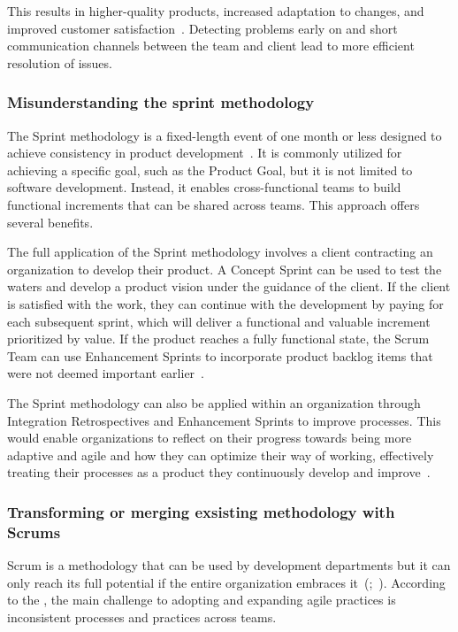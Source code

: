 This results in higher-quality products, increased \gls{adaptation} to changes, and improved \gls{customer} satisfaction~\cite[p.~99]{Abrahmson2002ASD}. Detecting problems early on and short communication channels between the team and \gls{client} lead to more efficient resolution of issues.

\subsubsection{Misunderstanding the sprint methodology}\label{subsubsec:UnderstandingSprints}
The Sprint \gls{methodology} is a fixed-length event of one month or less designed to achieve consistency in product development~\cite[p.~7]{Schwaber2020Tsg}. It is commonly utilized for achieving a specific goal, such as the Product Goal, but it is not limited to software development. Instead, it enables cross-functional teams to build functional increments that can be shared across teams. This approach offers several benefits.

The full application of the Sprint \gls{methodology} involves a \gls{client} contracting an organization to develop their product. A Concept Sprint can be used to test the waters and develop a product vision under the guidance of the \gls{client}. If the \gls{client} is satisfied with the work, they can continue with the development by paying for each subsequent sprint, which will deliver a functional and valuable increment prioritized by value. If the product reaches a fully functional state, the Scrum Team can use Enhancement Sprints to incorporate product backlog items that were not deemed important earlier~\cite[p.~2]{Sutherland2005Fos}.

The Sprint \gls{methodology} can also be applied within an organization through Integration Retrospectives and Enhancement Sprints to improve processes. This would enable organizations to reflect on their progress towards being more adaptive and \gls{agile} and how they can optimize their way of working, effectively treating their processes as a product they continuously develop and improve~\cite[pp.~395--396]{Rubin2012ESA}.

\subsubsection*{Transforming or merging exsisting methodology with Scrums}\label{subsubsec:TransformingTheMethodology}
Scrum is a \gls{methodology} that can be used by development departments but it can only reach its full potential if the entire organization embraces it~(;~). According to the , the main challenge to adopting and expanding \gls{agile} practices is inconsistent processes and practices across teams.

